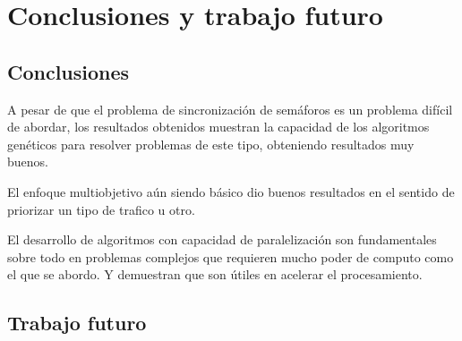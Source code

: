\chapter{Conclusiones y trabajo futuro}

\section{Conclusiones}
A pesar de que el problema de sincronización de semáforos es un problema difícil de abordar, los resultados obtenidos
muestran la capacidad de los algoritmos genéticos para resolver problemas de este tipo, obteniendo resultados muy buenos. 

El enfoque multiobjetivo aún siendo básico dio buenos resultados en el sentido de priorizar un tipo de trafico u otro.

El desarrollo de algoritmos con capacidad de paralelización son fundamentales sobre  todo en problemas complejos que requieren mucho poder de computo como el que se abordo. Y demuestran que son útiles en acelerar el procesamiento.
\section{Trabajo futuro}
